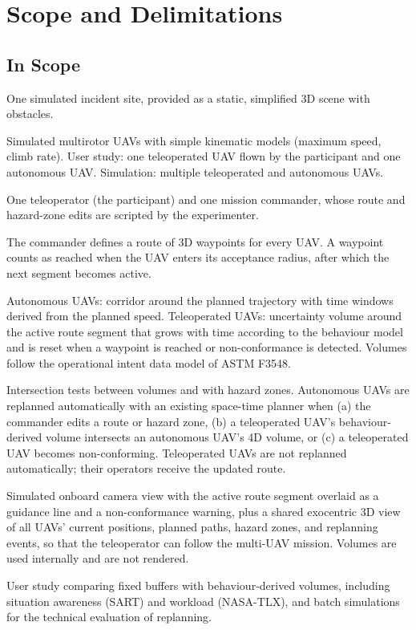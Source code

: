 \documentclass{article}
\begin{document}
\section{Scope and Delimitations}

\subsection{In Scope}
\begin{description}[style=nextline]
  \item[Scenario] One simulated incident site, provided as a static, simplified 3D scene with obstacles.
  \item[UAVs] Simulated multirotor UAVs with simple kinematic models (maximum speed, climb rate). User study: one teleoperated UAV flown by the participant and one autonomous UAV. Simulation: multiple teleoperated and autonomous UAVs.
  \item[Roles] One teleoperator (the participant) and one mission commander, whose route and hazard-zone edits are scripted by the experimenter.
  \item[Routes] The commander defines a route of 3D waypoints for every UAV. A waypoint counts as reached when the UAV enters its acceptance radius, after which the next segment becomes active.
  \item[Movement intent] Autonomous UAVs: corridor around the planned trajectory with time windows derived from the planned speed. Teleoperated UAVs: uncertainty volume around the active route segment that grows with time according to the behaviour model and is reset when a waypoint is reached or non-conformance is detected. Volumes follow the operational intent data model of ASTM F3548.
  \item[Deconfliction and replanning] Intersection tests between volumes and with hazard zones. Autonomous UAVs are replanned automatically with an existing space-time planner when (a) the commander edits a route or hazard zone, (b) a teleoperated UAV's behaviour-derived volume intersects an autonomous UAV's 4D volume, or (c) a teleoperated UAV becomes non-conforming. Teleoperated UAVs are not replanned automatically; their operators receive the updated route.
  \item[Situation awareness] Simulated onboard camera view with the active route segment overlaid as a guidance line and a non-conformance warning, plus a shared exocentric 3D view of all UAVs' current positions, planned paths, hazard zones, and replanning events, so that the teleoperator can follow the multi-UAV mission. Volumes are used internally and are not rendered.
  \item[Evaluation] User study comparing fixed buffers with behaviour-derived volumes, including situation awareness (SART) and workload (NASA-TLX), and batch simulations for the technical evaluation of replanning.
\end{description}
\end{document}
